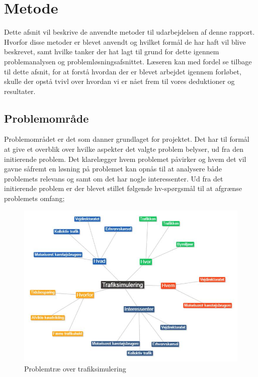 \chapter{Metode}
Dette afsnit vil beskrive de anvendte metoder til udarbejdelsen af denne rapport. Hvorfor disse metoder er blevet anvendt og hvilket formål de har haft vil blive beskrevet, samt hvilke tanker der hat lagt til grund for dette igennem problemanalysen og problemløsningsafsnittet. Læseren kan med fordel se tilbage til dette afsnit, for at forstå hvordan der er blevet arbejdet igennem forløbet, skulle der opstå tvivl over hvordan vi er nået frem til vores deduktioner og resultater.

\section{Problemområde}
Problemområdet er det som danner grundlaget for projektet. Det har til formål at give et overblik over hvilke aspekter det valgte problem belyser, ud fra den initierende problem. Det klarelægger hvem problemet påvirker og hvem det vil gavne såfremt en løsning på problemet kan opnås til at analysere både problemets relevans og samt om det har nogle interessenter.  Ud fra det initierende problem er der blevet stillet følgende hv-spørgsmål til at afgrænse problemets omfang;

\begin{figure}[H]
\begin{adjustbox}{width=1.2\textwidth,center=\textwidth}
\centering
\includegraphics[width=1.2\textwidth]{Pictures/Metode/metodebillede.jpg}
\end{adjustbox}
\label{fig:problemtreae}
\caption{Problemtræ over trafiksimulering}
\end{figure}


